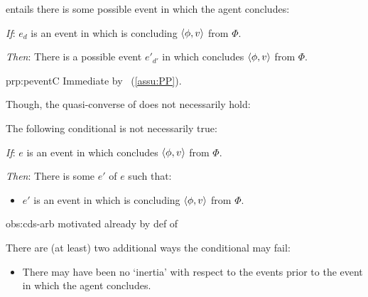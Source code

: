 \begin{note}
   entails there is some possible event in which the agent concludes:

  \begin{proposition}%
    \label{prp:peventC}%
    \vspace{-\baselineskip}
    \begin{itenum}
    \item[\emph{If}:]
      \(e_{d}\) is an event in which \vAgent{} is concluding \(\langle \phi, v \rangle\) from \(\Phi\).
    \item[\emph{Then}:]
      There is a possible event \(e'_{d'}\) in which \vAgent{} concludes \(\langle \phi, v \rangle\) from \(\Phi\).
    \end{itenum}
    \vspace{-\baselineskip}
  \end{proposition}

  \begin{argument}{prp:peventC}
    Immediate by \assuPP{}~(\autoref{assu:PP}).
  \end{argument}

  \noindent%
  Though, the quasi-converse of \assuPP{} does not necessarily hold:

  \begin{observation}%
    \label{obs:cds-arb}%
    The following conditional is not necessarily true:
    \begin{itenum}
    \item[\emph{If}:]
      \(e\) is an event in which \vAgent{} concludes \(\langle \phi, v \rangle\) from \(\Phi\).
    \item[\emph{Then}:]
      There is some  \(e'\) of \(e\) such that:
      \begin{itemize}
      \item
        \(e'\) is an event in which \vAgent{} is concluding \(\langle \phi, v \rangle\) from \(\Phi\).
      \end{itemize}
    \end{itenum}
    \vspace{-\baselineskip}
  \end{observation}

  \begin{motivation}{obs:cds-arb}
    {\color{green} motivated already by def of }

    There are (at least) two additional ways the conditional may fail:

    \begin{itemize}
    \item
      There may have been no `inertia' with respect to the events prior to the event in which the agent concludes.


\end{itemize}
\end{motivation}
\end{note}
